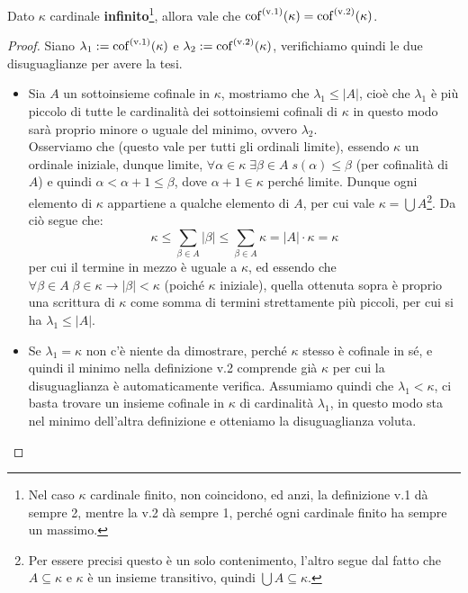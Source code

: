 \begin{proposition}
	Dato $\kappa$ cardinale \textbf{infinito}\footnote{Nel caso $\kappa$ cardinale finito, non coincidono, ed anzi, la definizione v.1 d\`a sempre 2, mentre la v.2 d\`a sempre 1, perch\'e ogni cardinale finito ha sempre un massimo.},
	allora vale che $\operatorname{cof}^{\text{(v.1)}}(\kappa) = \operatorname{cof}^{\text{(v.2)}}(\kappa)$.
\end{proposition}

\begin{proof}
	Siano $\lambda_1 := \operatorname{cof}^{\text{(v.1)}}(\kappa)$ e $\lambda_2 := \operatorname{cof}^{\text{(v.2)}}(\kappa)$, verifichiamo quindi le due disuguaglianze per avere la tesi.
	\begin{itemize}
		\item[$\boxed{\lambda_1 \leq \lambda_2}$] Sia $A$ un sottoinsieme cofinale in $\kappa$, mostriamo che $\lambda_1 \leq |A|$, cio\`e che $\lambda_1$ \`e pi\`u piccolo di tutte le cardinalit\`a dei sottoinsiemi cofinali di $\kappa$ in questo modo sar\`a proprio minore o uguale del minimo, ovvero $\lambda_2$.\\
		Osserviamo che (questo vale per tutti gli ordinali limite), essendo $\kappa$ un ordinale iniziale, dunque limite, $\forall \alpha \in \kappa \; \exists \beta \in A \; s(\alpha) \leq \beta$ (per cofinalit\`a di $A$) e quindi $\alpha < \alpha + 1 \leq \beta$, dove $\alpha + 1 \in \kappa$ perch\'e limite. Dunque ogni elemento di $\kappa$
		appartiene a qualche elemento di $A$, per cui vale $\kappa = \bigcup A$\footnote{Per essere precisi questo \`e un solo contenimento, l'altro segue dal fatto che $A \subseteq \kappa$ e $\kappa$ \`e un insieme transitivo, quindi $\bigcup A \subseteq \kappa$.}. Da ci\`o segue che:
		\[ \kappa \leq \sum_{\beta \in A} |\beta| \leq \sum_{\beta \in A} \kappa = |A| \cdot \kappa = \kappa
			\]
		per cui il termine in mezzo \`e uguale a $\kappa$, ed essendo che $\forall \beta \in A \; \beta \in \kappa \to |\beta| < \kappa$ (poich\'e $\kappa$ iniziale), quella ottenuta sopra \`e proprio una scrittura di $\kappa$ come somma di termini strettamente pi\`u piccoli, per cui si ha $ \lambda_1 \leq |A|$.
		\item[$\boxed{\lambda_2 \leq \lambda_1}$] Se $\lambda_1 = \kappa$ non c'\`e niente da dimostrare, perch\'e $\kappa$ stesso \`e cofinale in s\'e, e quindi il minimo nella definizione v.2 comprende gi\`a $\kappa$ per cui la disuguaglianza \`e automaticamente verifica. Assumiamo quindi che $\lambda_1 < \kappa$, ci basta trovare un insieme cofinale in $\kappa$ di cardinalit\`a $\lambda_1$, in questo modo sta nel minimo dell'altra definizione e otteniamo la disuguaglianza voluta.

\end{itemize}
\end{proof}
